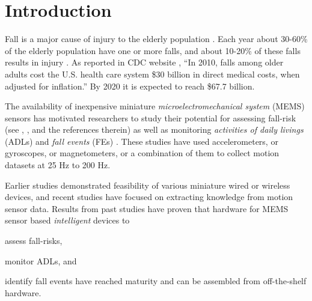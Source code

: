 \documentclass[]{IEEEtran}
\begin{document}
\section{Introduction}
\label{sec:Intro}
Fall is a major cause of injury to the elderly population \cite{Rubenstein2006}. 
Each year about 30-60\% of the elderly population have one or more falls, and  about 10-20\% of these falls results in injury \cite{Rubenstein2006}. 
As reported in CDC website \cite{CDC2014July},
``In 2010, falls among older adults cost the U.S. health care system \$30 billion in direct medical costs, when adjusted for inflation.'' By 2020 it is expected to reach \$67.7 billion. 
\par 
The availability of inexpensive miniature \emph{microelectromechanical system} (MEMS) sensors  has motivated researchers  to study their potential for assessing fall-risk  (see \cite{shanyReview2012}, \cite{howcroftReview2013}, and the references therein) as well as monitoring \emph{activities of daily livings} (ADLs) \cite{alvarezActivityAndFallRecognotion2015,BaoActivityrecognition2004,DernbachActivityAndFallDetectionPhone2012,krishnanActivityRecognition2014,kumarActivitAndFallDetection2013} and \emph{fall events} (FEs) \cite{baekFallDetection2013,baiFallDetectionPhone2013,DernbachActivityAndFallDetectionPhone2012,dumitracheFallDetection2013,kumarActivitAndFallDetection2013,leoneFallDetection2013,liangFallDetection2012,liFallDetection2009,moyaFallAndDamageDetection2015,ojetolaFallDetection2011,ShenFallDetectionPhone2015,steidlFallDetection2012,DoukasFallDetection2011,ErdoganFallDetection2014,JianFallDetection2015}. These studies have used  accelerometers,  or gyroscopes, or magnetometers, or  a combination of them to collect motion datasets at  25 Hz to 200 Hz.  
\par
Earlier studies demonstrated feasibility of various miniature wired or wireless devices, and recent studies have focused on extracting knowledge from motion sensor data.  Results from past studies have proven  that hardware for MEMS sensor based \emph{intelligent} devices to \begin{inparaenum} [($i$)] \item assess fall-risks, \item monitor ADLs, and \item identify fall events have reached maturity and can be assembled from off-the-shelf hardware. \end{inparaenum}  
\end{document}
